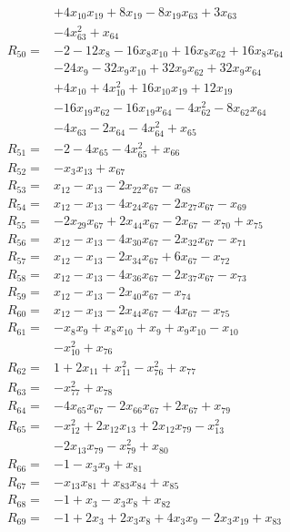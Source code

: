 \begin{align*}
&+4x_{10}x_{19} +8x_{19} -8x_{19}x_{63} +3x_{63}\\
&-4x_{63}^{2} +x_{64}\\[3pt]
R_{50}={}&-2 -12x_{8} -16x_{8}x_{10} +16x_{8}x_{62} +16x_{8}x_{64}\\
&-24x_{9} -32x_{9}x_{10} +32x_{9}x_{62} +32x_{9}x_{64}\\
&+4x_{10} +4x_{10}^{2} +16x_{10}x_{19} +12x_{19}\\
&-16x_{19}x_{62} -16x_{19}x_{64} -4x_{62}^{2} -8x_{62}x_{64}\\
&-4x_{63} -2x_{64} -4x_{64}^{2} +x_{65}\\[3pt]
R_{51}={}&-2 -4x_{65} -4x_{65}^{2} +x_{66}\\[3pt]
R_{52}={}&-x_{3}x_{13} +x_{67}\\[3pt]
R_{53}={}&x_{12} -x_{13} -2x_{22}x_{67} -x_{68}\\[3pt]
R_{54}={}&x_{12} -x_{13} -4x_{24}x_{67} -2x_{27}x_{67} -x_{69}\\[3pt]
R_{55}={}&-2x_{29}x_{67} +2x_{44}x_{67} -2x_{67} -x_{70} +x_{75}\\[3pt]
R_{56}={}&x_{12} -x_{13} -4x_{30}x_{67} -2x_{32}x_{67} -x_{71}\\[3pt]
R_{57}={}&x_{12} -x_{13} -2x_{34}x_{67} +6x_{67} -x_{72}\\[3pt]
R_{58}={}&x_{12} -x_{13} -4x_{36}x_{67} -2x_{37}x_{67} -x_{73}\\[3pt]
R_{59}={}&x_{12} -x_{13} -2x_{40}x_{67} -x_{74}\\[3pt]
R_{60}={}&x_{12} -x_{13} -2x_{44}x_{67} -4x_{67} -x_{75}\\[3pt]
R_{61}={}&-x_{8}x_{9} +x_{8}x_{10} +x_{9} +x_{9}x_{10} -x_{10}\\
&-x_{10}^{2} +x_{76}\\[3pt]
R_{62}={}&1 +2x_{11} +x_{11}^{2} -x_{76}^{2} +x_{77}\\[3pt]
R_{63}={}&-x_{77}^{2} +x_{78}\\[3pt]
R_{64}={}&-4x_{65}x_{67} -2x_{66}x_{67} +2x_{67} +x_{79}\\[3pt]
R_{65}={}&-x_{12}^{2} +2x_{12}x_{13} +2x_{12}x_{79} -x_{13}^{2}\\
&-2x_{13}x_{79} -x_{79}^{2} +x_{80}\\[3pt]
R_{66}={}&-1 -x_{3}x_{9} +x_{81}\\[3pt]
R_{67}={}&-x_{13}x_{81} +x_{83}x_{84} +x_{85}\\[3pt]
R_{68}={}&-1 +x_{3} -x_{3}x_{8} +x_{82}\\[3pt]
R_{69}={}&-1 +2x_{3} +2x_{3}x_{8} +4x_{3}x_{9} -2x_{3}x_{19} +x_{83}\\[3pt]

\end{align*}
